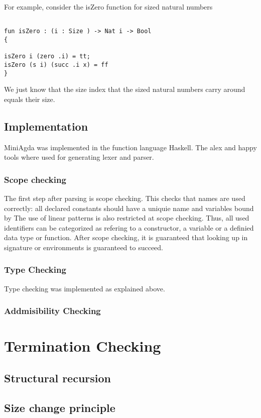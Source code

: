For example, consider the isZero function for sized natural numbers

\begin{verbatim}

fun isZero : (i : Size ) -> Nat i -> Bool
{

isZero i (zero .i) = tt;
isZero (s i) (succ .i x) = ff
}
\end{verbatim}
We just know that the size index that the sized natural numbers carry around equals their size.


\section{Implementation}

MiniAgda was implemented in the function language Haskell.
The alex and happy tools where used for generating lexer and parser.

\subsection{Scope checking}
The first step after parsing is scope checking. This checks that names are used correctly:
all declared constants should have a uniquie name and variables bound by 
The use of linear patterns is also restricted at scope checking.
Thus, all used identifiers can be categorized as refering to a constructor, a variable or a definied data type or
function.
After scope checking, it is guaranteed that looking up in signature or environments is guaranteed to succeed.
\subsection{Type Checking}
Type checking was implemented as explained above.
\subsection{Addmisibility Checking}

\chapter{Termination Checking}

\section{Structural recursion}

\section{Size change principle}

